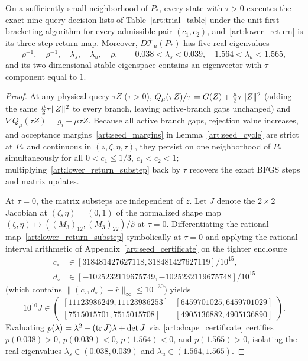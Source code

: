 \begin{lemma}\label{art:lower_hyperbolic}
On a sufficiently small neighborhood of $P_*$, every state with $\tau>0$
executes the exact nine-query decision lists of Table~\ref{art:trial_table}
under the unit-first bracketing algorithm for every admissible pair $(c_1,c_2)$,
and~\eqref{art:lower_return} is its three-step return map. Moreover,
$D\mathcal T_\mu(P_*)$ has five real eigenvalues
\[
 \rho^{-1},\quad\rho^{-1},\quad\lambda_s,\quad\lambda_u,\quad\rho,
 \qquad 0.038<\lambda_s<0.039,\quad 1.564<\lambda_u<1.565,
\]
and its two-dimensional stable eigenspace contains an eigenvector with
$\tau$-component equal to $1$.
\end{lemma}
\begin{proof}
At any physical query $\tau Z$ ($\tau>0$), $Q_\mu(\tau Z)/\tau=G(Z)+\tfrac\mu2\tau\lVert Z\rVert^2$
(adding the same $\tfrac\mu2\tau\lVert Z\rVert^2$ to every branch, leaving active-branch
gaps unchanged) and $\nabla Q_\mu(\tau Z)=g_i+\mu\tau Z$. Because all active
branch gaps, rejection value increases, and acceptance margins~\eqref{art:seed_margins}
in Lemma~\ref{art:seed_cycle} are strict at $P_*$ and continuous in
$(z,\zeta,\eta,\tau)$, they persist on one neighborhood of $P_*$ simultaneously
for all $0<c_1\le1/3$, $c_1<c_2<1$; multiplying~\eqref{art:lower_return_substep}
back by $\tau$ recovers the exact BFGS steps and matrix updates.

At $\tau=0$, the matrix substeps are independent of $z$. Let $J$ denote the
$2\times2$ Jacobian at $(\zeta,\eta)=(0,1)$ of the normalized shape map
$(\zeta,\eta)\mapsto((M_3)_{12},(M_3)_{22})/\hat\rho$ at $\tau=0$. Differentiating
the rational map~\eqref{art:lower_return_substep} symbolically at $\tau=0$ and
applying the rational interval arithmetic of Appendix~\ref{art:seed_certificate}
on the tighter enclosure
\begin{align*}
 c_\circ&\in[318481427627118,318481427627119]/10^{15},\\
 d_\circ&\in[-1025232119675749,-1025232119675748]/10^{15}
\end{align*}
(which contains $\|(c_\circ,d_\circ)-\bar r\|_\infty\le10^{-30}$) yields
\begin{equation}\label{art:shape_certificate}
 10^{10}J\in
 \begin{pmatrix}
 [11123986249,11123986253]&[6459701025,6459701029]\\
 [7515015701,7515015708]&[4905136882,4905136890]
 \end{pmatrix}.
\end{equation}
Evaluating $p(\lambda)=\lambda^2-(\operatorname{tr} J)\lambda+\det J$ via~\eqref{art:shape_certificate}
certifies $p(0.038)>0$, $p(0.039)<0$, $p(1.564)<0$, and $p(1.565)>0$, isolating
the real eigenvalues $\lambda_s\in(0.038,0.039)$ and $\lambda_u\in(1.564,1.565)$.


\end{proof}
